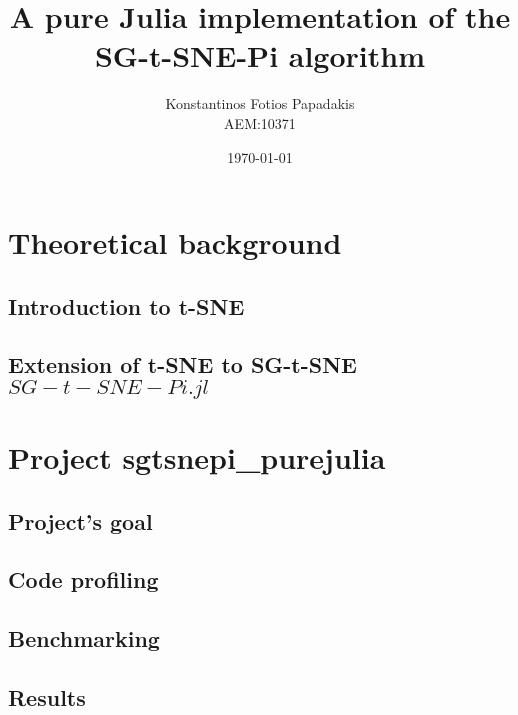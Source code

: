 \documentclass[twocolumn]{report}
\begin{document}
\title{\Huge \bfseries A pure Julia implementation of the SG-t-SNE-Pi algorithm} %
\author{Konstantinos Fotios Papadakis\vspace{0.5cm} \\  AEM:10371} %
\date{\today}
\maketitle

\tableofcontents

%

\chapter{Theoretical background}
\section{Introduction to t-SNE}

\section{Extension of t-SNE to SG-t-SNE \(SG-t-SNE-Pi.jl\)}


\chapter{Project sgtsnepi\_purejulia}
\section{Project's goal}

\section{Code profiling}

\section{Benchmarking}

\section{Results}

\end{document}
